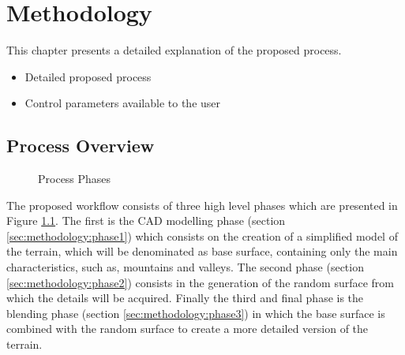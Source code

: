 \chapter{Methodology} \label{chap:methodology}

This chapter presents a detailed explanation of the proposed process. 



\begin{itemize}
	\item Detailed proposed process
	\item Control parameters available to the user
\end{itemize}

\section{Process Overview}

\begin{figure}[h!]
	\begin{center}
	\end{center}
	
	\caption{Process Phases}
	\label{fig:process_phases}
\end{figure}

The proposed workflow consists of three high level phases which are presented in Figure \ref{fig:process_phases}. The first is the CAD modelling phase (section \ref{sec:methodology:phase1}) which consists on the creation of a simplified model of the terrain, which will be denominated as base surface, containing only the main characteristics, such as, mountains and valleys. The second phase (section \ref{sec:methodology:phase2}) consists in the generation of the random surface from which the details will be acquired. Finally the third and final phase is the blending phase (section \ref{sec:methodology:phase3}) in which the base surface is combined with the random surface to create a more detailed version of the terrain.


